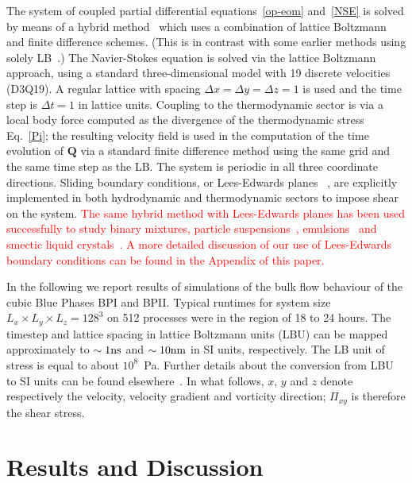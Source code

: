 \documentclass[8.5pt,twoside,twocolumn]{article}
\newcommand{\rev}[1]{{\textcolor{red}{#1}}}
\begin{document}
The system of coupled partial differential equations~\ref{op-eom}
and~\ref{NSE} is solved by means of a hybrid method~\cite{Marenduzzo:2007}
which uses a combination of lattice Boltzmann and finite difference schemes.
(This is in contrast with some earlier methods using solely
LB~\cite{Denniston:2001, Denniston:2004}.)
The Navier-Stokes
equation is solved via the lattice Boltzmann approach, using a standard
three-dimensional model with 19 discrete velocities (D3Q19).
A regular lattice with spacing $\Delta x = \Delta y = \Delta z = 1$ is
used and the time step is $\Delta t = 1$ in lattice units.
Coupling to the thermodynamic sector is via a
local body force computed as the divergence of the thermodynamic
stress Eq.~\ref{Pi}; the resulting velocity field is used in the computation
of the time evolution of $\mathbf{Q}$ via a standard finite difference
method using the same grid and the same time step as the LB. The system
is periodic in all three coordinate directions. Sliding
boundary conditions, or Lees-Edwards planes ~\cite{Wagner:2002}, are explicitly implemented
in both hydrodynamic and thermodynamic sectors to impose shear on the
system. 
\rev{
The same hybrid method with Lees-Edwards planes
has been used successfully to study binary mixtures, particle suspensions~\cite{MacMeccan:2009, Aidun:2010}, 
emulsions~\cite{Frijters:2012} and smectic liquid crystals~\cite{Henrich:2012a}.
A more detailed discussion of our use of Lees-Edwards boundary conditions can be found in the Appendix 
of this paper.
}

In the following we report results of simulations of the bulk flow behaviour of the cubic Blue 
Phases BPI and BPII.
Typical runtimes for system size $L_x\times L_y\times L_z=128^3$ on 512 processes were in the region of 18 to 24 hours.  
The timestep and lattice spacing in lattice Boltzmann units (LBU) can be mapped
approximately to $\sim 1 {\rm ns}$ and $\sim 10{\rm nm}$ in SI units, respectively. The LB unit of stress
is equal to about $10^8$~Pa. Further details about the conversion 
from LBU to SI units can be found elsewhere~\cite{Henrich:2011a,Henrich:2010b}.
In what follows, $x$, $y$ and $z$ denote respectively the velocity, velocity
gradient and vorticity direction; $\Pi_{xy}$ is therefore the shear stress.

\section{Results and Discussion}
\end{document}
